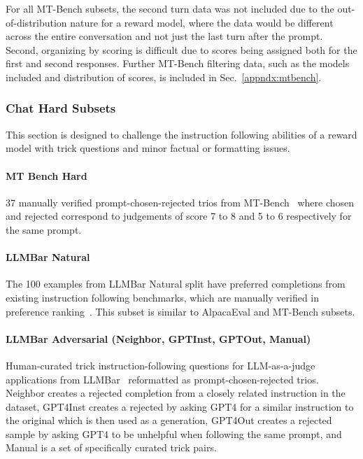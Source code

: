 \begin{appendices}
For all MT-Bench subsets, the second turn data was not included due to the out-of-distribution nature for a reward model, where the data would be different across the entire conversation and not just the last turn after the prompt.
Second, organizing by scoring is difficult due to scores being assigned both for the first and second responses.
Further MT-Bench filtering data, such as the models included and distribution of scores, is included in Sec.~\ref{appndx:mtbench}.


\subsubsection{Chat Hard Subsets}
This section is designed to challenge the instruction following abilities of a reward model with trick questions and minor factual or formatting issues.

\paragraph{MT Bench Hard}
37 manually verified prompt-chosen-rejected trios from MT-Bench~\citep{zheng2023judging} where chosen and rejected correspond to judgements of score 7 to 8 and 5 to 6 respectively for the same prompt.


\paragraph{LLMBar Natural}
The 100 examples from LLMBar Natural split have preferred completions from existing instruction following benchmarks, which are manually verified in preference ranking~\citep{zeng2023llmbar}.
This subset is similar to AlpacaEval and MT-Bench subsets.

\paragraph{LLMBar Adversarial (Neighbor, GPTInst, GPTOut, Manual)}
Human-curated trick instruction-following questions for LLM-as-a-judge applications from LLMBar~\citep{zeng2023llmbar} reformatted as prompt-chosen-rejected trios.
Neighbor creates a rejected completion from a closely related instruction in the dataset, GPT4Inst creates a rejected by asking GPT4 for a similar instruction to the original which is then used as a generation, GPT4Out creates a rejected sample by asking GPT4 to be unhelpful when following the same prompt, and Manual is a set of specifically curated trick pairs. 


\end{appendices}
